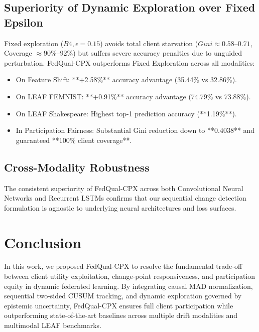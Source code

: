 \documentclass[journal,compsoc]{IEEEtran}
\begin{document}
\subsection{Superiority of Dynamic Exploration over Fixed Epsilon}
Fixed exploration ($B4, \epsilon=0.15$) avoids total client starvation ($Gini \approx 0.58$--$0.71$, Coverage $\approx 90\%$--$92\%$) but suffers severe accuracy penalties due to unguided perturbation. FedQual-CPX outperforms Fixed Exploration across all modalities:
\begin{itemize}
    \item On Feature Shift: **+2.58\%** accuracy advantage (35.44\% vs 32.86\%).
    \item On LEAF FEMNIST: **+0.91\%** accuracy advantage (74.79\% vs 73.88\%).
    \item On LEAF Shakespeare: Highest top-1 prediction accuracy (**1.19\%**).
    \item In Participation Fairness: Substantial Gini reduction down to **0.4038** and guaranteed **100\% client coverage**.
\end{itemize}

\subsection{Cross-Modality Robustness}
The consistent superiority of FedQual-CPX across both Convolutional Neural Networks and Recurrent LSTMs confirms that our sequential change detection formulation is agnostic to underlying neural architectures and loss surfaces.

\section{Conclusion}
In this work, we proposed FedQual-CPX to resolve the fundamental trade-off between client utility exploitation, change-point responsiveness, and participation equity in dynamic federated learning. By integrating causal MAD normalization, sequential two-sided CUSUM tracking, and dynamic exploration governed by epistemic uncertainty, FedQual-CPX ensures full client participation while outperforming state-of-the-art baselines across multiple drift modalities and multimodal LEAF benchmarks.



\end{document}
